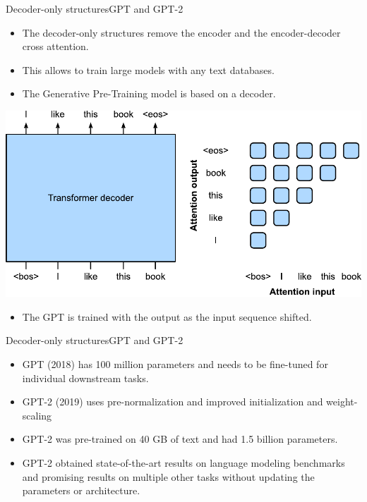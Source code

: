 \documentclass{beamer}
\begin{document}
\begin{frame}{Decoder-only structures}{GPT and GPT-2}
\begin{itemize}
    \item The decoder-only structures remove the encoder and the encoder-decoder cross attention. 
    \item This allows to train large models with any text databases. 
    \item The Generative Pre-Training model is based on a decoder. 
\end{itemize}    
\begin{center}
    \includegraphics[scale=0.4]{Module 6 (Attention-based networks)/pics/gpt-decoder-only.pdf}
\end{center}
\begin{itemize}
    \item The GPT is trained with the output as the input sequence shifted.
\end{itemize}
\end{frame}
\begin{frame}{Decoder-only structures}{GPT and GPT-2}
    \begin{itemize}
        \item GPT (2018) has 100 million parameters and needs to be fine-tuned for individual downstream tasks. 
        \item GPT-2 (2019) uses pre-normalization  and improved initialization and weight-scaling 
        \item GPT-2 was pre-trained on 40 GB of text and had 1.5 billion parameters.
        \item GPT-2 obtained state-of-the-art results on language modeling benchmarks and promising results on multiple other tasks without updating the parameters or architecture.
    \end{itemize}
\end{frame}
\end{document}
